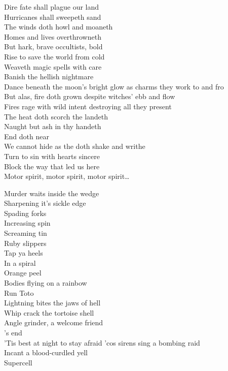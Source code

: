 Dire fate shall plague our land \\
Hurricanes shall sweepeth sand \\
The winds doth howl and moaneth \\
Homes and lives overthrowneth \\
But hark, brave occultists, bold \\
Rise to save the world from cold \\
Weaveth magic spells with care \\
Banish the hellish nightmare \\

Dance beneath the moon's bright glow as charms they work to and fro \\
But alas, fire doth grown despite witches' ebb and flow \\
Fires rage with wild intent destroying all they present \\
The heat doth scorch the landeth \\
Naught but ash in thy handeth \\

End doth near \\
We cannot hide as the  doth shake and writhe \\
Turn to sin with hearts sincere \\
Block the way that led us here \\

Motor spirit, motor spirit, motor spirit… \\



Murder waits inside the wedge \\
Sharpening it's sickle edge \\
Spading forks \\
Increasing spin \\
Screaming tin \\
Ruby slippers \\
Tap ya heels \\
In a spiral \\
Orange peel \\
Bodies flying on a rainbow \\
Run Toto \\
Lightning bites the jaws of hell \\
Whip crack the tortoise shell \\
Angle grinder, a welcome friend \\
's end \\
'Tis best at night to stay afraid 'cos sirens sing a bombing raid \\
Incant a blood-curdled yell \\
Supercell \\

